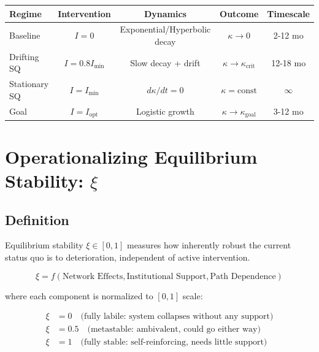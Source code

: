 \documentclass[11pt, a4paper]{article}
\begin{document}
\begin{center}
\begin{tabular}{|l|c|c|c|c|}
\hline
\textbf{Regime} & \textbf{Intervention} & \textbf{Dynamics} & \textbf{Outcome} & \textbf{Timescale} \\
\hline
Baseline & $I = 0$ & Exponential/Hyperbolic decay & $\kappa \to 0$ & 2-12 mo \\
Drifting SQ & $I = 0.8 I_{\min}$ & Slow decay + drift & $\kappa \to \kappa_{\text{crit}}$ & 12-18 mo \\
Stationary SQ & $I = I_{\min}$ & $d\kappa/dt = 0$ & $\kappa = \text{const}$ & $\infty$ \\
Goal & $I = I_{\text{opt}}$ & Logistic growth & $\kappa \to \kappa_{\text{goal}}$ & 3-12 mo \\
\hline
\end{tabular}
\end{center}


\section{Operationalizing Equilibrium Stability: $\xi$}

\subsection{Definition}

\begin{definition}
Equilibrium stability $\xi \in [0, 1]$ measures how inherently robust the current
status quo is to deterioration, independent of active intervention.

$$\xi = f(\text{Network Effects}, \text{Institutional Support}, \text{Path Dependence})$$

\vspace{0.5cm}
\noindent
where each component is normalized to $[0, 1]$ scale:

\begin{align}
\xi &= 0 \quad \text{(fully labile: system collapses without any support)} \\
\xi &= 0.5 \quad \text{(metastable: ambivalent, could go either way)} \\
\xi &= 1 \quad \text{(fully stable: self-reinforcing, needs little support)}
\end{align}
\end{definition}
\end{document}
